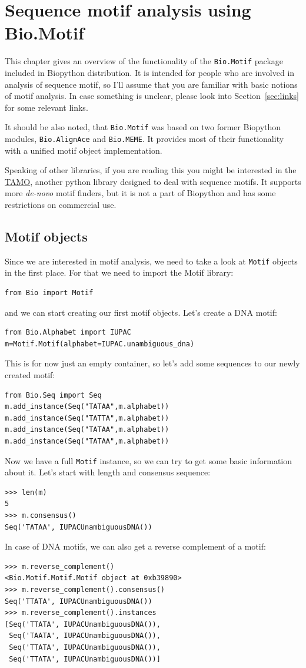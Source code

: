 \documentclass{report}
\begin{document}
\chapter{Sequence motif analysis using Bio.Motif}
\label{chap:bio_motif}

This chapter gives an overview of the functionality of the
\verb|Bio.Motif| package included in Biopython distribution. It is intended
for people who are involved in analysis of sequence motif, so I'll
assume that you are familiar with basic notions of motif analysis. In
case something is unclear, please look into Section~\ref{sec:links}
for some relevant links.

It should be also noted, that \verb|Bio.Motif| was based on two
former Biopython modules, \verb|Bio.AlignAce| and \verb|Bio.MEME|. It provides
 most of their functionality with a unified motif object implementation.

Speaking of other libraries, if you are reading this you might be
interested in the \href{http://fraenkel.mit.edu/TAMO/}{TAMO}, another python library
designed to deal with sequence motifs. It supports more \emph{de-novo}
motif finders, but it is not a part of Biopython and has some restrictions
on commercial use.

\section{Motif objects}
\label{sec:object}
Since we are interested in motif analysis, we need to take a look at
\verb|Motif| objects in the first place. For that we need to import 
the Motif library:
\begin{verbatim}
from Bio import Motif
\end{verbatim}
and we can start creating our first motif objects. Let's create a DNA motif:
\begin{verbatim}
from Bio.Alphabet import IUPAC
m=Motif.Motif(alphabet=IUPAC.unambiguous_dna)
\end{verbatim}
This is for now just an empty container, so let's add some sequences to our newly created motif:
\begin{verbatim}
from Bio.Seq import Seq
m.add_instance(Seq("TATAA",m.alphabet))
m.add_instance(Seq("TATTA",m.alphabet))
m.add_instance(Seq("TATAA",m.alphabet))
m.add_instance(Seq("TATAA",m.alphabet))
\end{verbatim}
Now we have a full \verb|Motif| instance, so we can try to get some
basic information about it. Let's start with length and consensus
sequence:
\begin{verbatim}
>>> len(m)
5
>>> m.consensus()
Seq('TATAA', IUPACUnambiguousDNA())
\end{verbatim}
In case of DNA motifs, we can also get a reverse complement of a motif:
\begin{verbatim}
>>> m.reverse_complement()
<Bio.Motif.Motif.Motif object at 0xb39890>
>>> m.reverse_complement().consensus()
Seq('TTATA', IUPACUnambiguousDNA())
>>> m.reverse_complement().instances  
[Seq('TTATA', IUPACUnambiguousDNA()), 
 Seq('TAATA', IUPACUnambiguousDNA()), 
 Seq('TTATA', IUPACUnambiguousDNA()), 
 Seq('TTATA', IUPACUnambiguousDNA())]
\end{verbatim}
\end{document}
